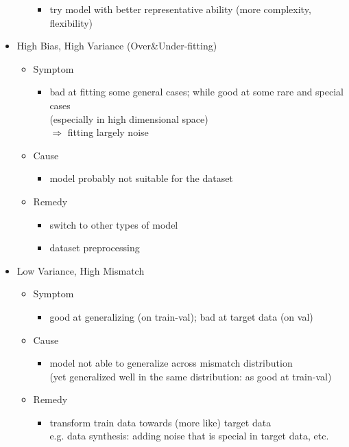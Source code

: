 \begin{itemize}
\begin{itemize}
\begin{itemize}
		\item try model with better representative ability (more complexity, flexibility)
		\end{itemize}
	\end{itemize}
\item High Bias, High Variance (Over\&Under-fitting)
	\begin{itemize}
	\item Symptom
		\begin{itemize}
		\item bad at fitting some general cases; while good at some rare and special cases \\
		(especially in high dimensional space) \\
		$\Rightarrow$ fitting largely noise
		\end{itemize}
	\item Cause
		\begin{itemize}
		\item model probably not suitable for the dataset
		\end{itemize}
	\item Remedy
		\begin{itemize}
		\item switch to other types of model
		\item dataset preprocessing
		\end{itemize}
	\end{itemize}
\item Low Variance, High Mismatch
	\begin{itemize}
	\item Symptom
		\begin{itemize}
		\item good at generalizing (on train-val); bad at target data (on val)
		\end{itemize}
	\item Cause
		\begin{itemize}
		\item model not able to generalize across mismatch distribution \\ 
		(yet generalized well in the same distribution: as good at train-val)
		\end{itemize}
	\item Remedy
		\begin{itemize}
		\item transform train data towards (more like) target data \\
		e.g. data synthesis: adding noise that is special in target data, etc.

\end{itemize}
\end{itemize}
\end{itemize}
